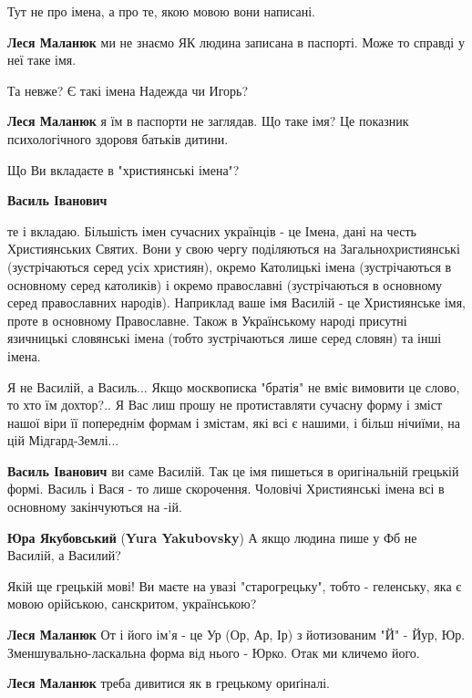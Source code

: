 \begin{itemize}
\begin{itemize} %
Тут не про імена, а про те, якою мовою вони написані.

\textbf{Леся Маланюк} ми не знаємо ЯК людина записана в паспорті. Може то справді у неї таке імя.

Та невже? Є такі імена Надежда чи Игорь?

\textbf{Леся Маланюк} я їм в паспорти не заглядав. Що таке імя? Це показник психологічного здоровя батьків дитини.

Що Ви вкладаєте в "християнські імена"?

\textbf{Василь Іванович} 

те і вкладаю. Більшість імен сучасних українців - це Імена, дані на честь
Християнських Святих. Вони у свою чергу поділяються на Загальнохристиянські
(зустрічаються серед усіх християн), окремо Католицькі імена (зустрічаються в
основному серед католиків) і окремо православні (зустрічаються в основному
серед православних народів). Наприклад ваше імя Василій - це Християнське імя,
проте в основному Православне. Також в Українському народі присутні язичницькі
словянські імена (тобто зустрічаються лише серед словян) та інші імена.



Я не Василій, а Василь... Якщо москвописка "братія" не вміє вимовити це слово,
то хто їм дохтор?.. Я Вас лиш прошу не протиставляти сучасну форму і зміст
нашої віри її попереднім формам і змістам, які всі є нашими, і більш нічиїми,
на цій Мідгард-Землі...

\textbf{Василь Іванович} ви саме Василій. Так це імя пишеться в оригінальній грецькій формі. Василь і Вася - то лише скорочення. Чоловічі Християнські імена всі в основному закінчуються на -ій.

\textbf{Юра Якубовський} (\textbf{Yura Yakubovsky}) А якщо людина пише у Фб не Василій, а Василий?

Якій ще грецькій мові! Ви маєте на увазі "старогрецьку", тобто - геленську, яка є мовою орійською, санскритом, українською?

\textbf{Леся Маланюк} От і його ім'я - це Ур (Ор, Ар, Ір) з йотизованим "Й" -
Йур, Юр. Зменшувально-ласкальна форма від нього - Юрко. Отак ми кличемо його.

\textbf{Леся Маланюк} треба дивитися як в грецькому ориґіналі.


\end{itemize}
\end{itemize}
